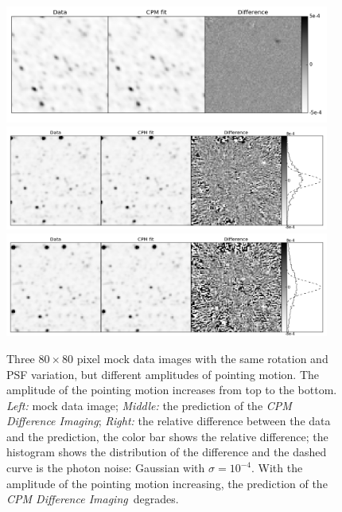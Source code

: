 \documentclass[12pt, preprint]{aastex}
\newcommand{\project}[1]{\textsl{#1}}
\newcommand{\cpmdiff}{\project{CPM Difference Imaging}}
\begin{document}
\begin{figure}[p]
\begin{center}
\includegraphics[width=0.95\textwidth]{f7a}
\includegraphics[width=0.95\textwidth]{f7b}
\includegraphics[width=0.95\textwidth]{f7c}
\end{center}
\caption{
  \label{large_motion}
  Three $80\times 80$ pixel mock data images with the same rotation and PSF variation, but different amplitudes of pointing motion. The amplitude of the pointing motion increases from top to the bottom.
  \emph{Left:} mock data image;
  \emph{Middle:} the prediction of the \cpmdiff;
  \emph{Right:} the relative difference between the data and the prediction, the color bar shows the relative difference; the histogram shows the distribution of the difference and the dashed curve is the photon noise: Gaussian with $\sigma = 10^{-4}$. 
  With the amplitude of the pointing motion increasing, the prediction of the \cpmdiff\ degrades.
}
\end{figure}
\end{document}
